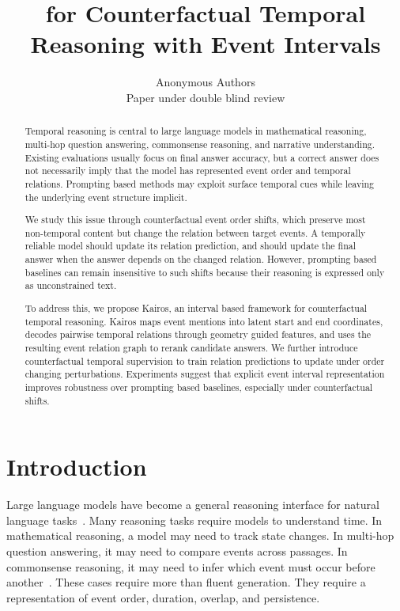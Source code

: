 \documentclass[11pt]{article}
\title{\method{} for Counterfactual Temporal Reasoning with Event Intervals}
\author{Anonymous Authors \\
Paper under double blind review}
\newcommand{\method}{Kairos}
\begin{document}
\maketitle

\begin{abstract}
Temporal reasoning is central to large language models in mathematical reasoning, multi-hop question answering, commonsense reasoning, and narrative understanding. Existing evaluations usually focus on final answer accuracy, but a correct answer does not necessarily imply that the model has represented event order and temporal relations. Prompting based methods may exploit surface temporal cues while leaving the underlying event structure implicit.

We study this issue through counterfactual event order shifts, which preserve most non-temporal content but change the relation between target events. A temporally reliable model should update its relation prediction, and should update the final answer when the answer depends on the changed relation. However, prompting based baselines can remain insensitive to such shifts because their reasoning is expressed only as unconstrained text.

To address this, we propose \method, an interval based framework for counterfactual temporal reasoning. \method{} maps event mentions into latent start and end coordinates, decodes pairwise temporal relations through geometry guided features, and uses the resulting event relation graph to rerank candidate answers. We further introduce counterfactual temporal supervision to train relation predictions to update under order changing perturbations. Experiments suggest that explicit event interval representation improves robustness over prompting based baselines, especially under counterfactual shifts.
\end{abstract}

\section{Introduction}

Large language models have become a general reasoning interface for natural language tasks~\citep{brown2020language,ouyang2022training,achiam2023gpt4,touvron2023llama,yang2024qwen25}. Many reasoning tasks require models to understand time. In mathematical reasoning, a model may need to track state changes. In multi-hop question answering, it may need to compare events across passages. In commonsense reasoning, it may need to infer which event must occur before another~\citep{cobbe2021training,geva2021strategyqa,trivedi2022musique,ho2020constructing}. These cases require more than fluent generation. They require a representation of event order, duration, overlap, and persistence.
\end{document}
